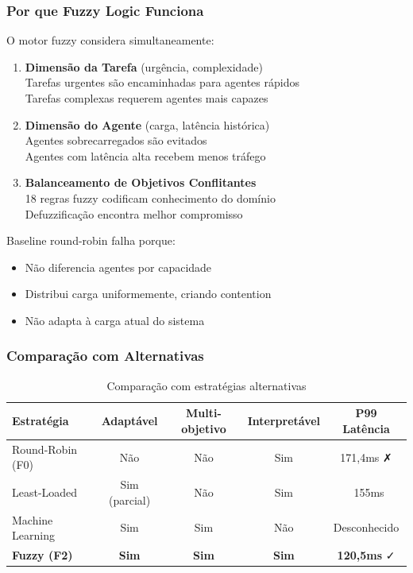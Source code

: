\subsubsection{Por que Fuzzy Logic Funciona}

O motor fuzzy considera simultaneamente:
\begin{enumerate}
  \item \textbf{Dimensão da Tarefa} (urgência, complexidade)
  \\ Tarefas urgentes são encaminhadas para agentes rápidos
  \\ Tarefas complexas requerem agentes mais capazes

  \item \textbf{Dimensão do Agente} (carga, latência histórica)
  \\ Agentes sobrecarregados são evitados
  \\ Agentes com latência alta recebem menos tráfego

  \item \textbf{Balanceamento de Objetivos Conflitantes}
  \\ 18 regras fuzzy codificam conhecimento do domínio
  \\ Defuzzificação encontra melhor compromisso
\end{enumerate}

Baseline round-robin falha porque:
\begin{itemize}
  \item Não diferencia agentes por capacidade
  \item Distribui carga uniformemente, criando contention
  \item Não adapta à carga atual do sistema
\end{itemize}

\subsubsection{Comparação com Alternativas}

\begin{table}[h]
\centering
\caption{Comparação com estratégias alternativas}
\label{tab:fuzzy_comparison}
\begin{tabularx}{\textwidth}{|l|c|c|c|c|}
\hline
\textbf{Estratégia} & \textbf{Adaptável} & \textbf{Multi-objetivo} & \textbf{Interpretável} & \textbf{P99 Latência} \\
\hline
Round-Robin (F0) & Não & Não & Sim & 171,4ms ✗ \\
\hline
Least-Loaded & Sim (parcial) & Não & Sim & ~155ms \\
\hline
Machine Learning & Sim & Sim & Não & Desconhecido \\
\hline
\textbf{Fuzzy (F2)} & \textbf{Sim} & \textbf{Sim} & \textbf{Sim} & \textbf{120,5ms} ✓ \\
\hline
\end{tabularx}
\end{table}

